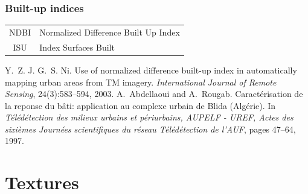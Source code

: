 \documentclass[compress]{beamer}
\begin{document}
\begin{frame}
\frametitle{Built-up indices}
\footnotesize \centering
\begin{tabular}{|c|l|}
\hline
NDBI &  Normalized Difference Built Up Index \cite{Zha2003-NDBI} \\
ISU &  Index Surfaces Built \cite{Abdellaoui1997-ISU} \\
\hline
\end{tabular}
\begin{thebibliography}{noidea}
\tiny
{}
Y.~Z. J. G.~S. Ni.
 Use of normalized difference built-up index in automatically mapping
  urban areas from {TM} imagery.
 {\em International Journal of Remote Sensing}, 24(3):583--594,
        2003.
A.~Abdellaoui and A.~Rougab.
 Caract\'erisation de la reponse du b\^ati: application au complexe
  urbain de {B}lida ({A}lg\'erie).
 In {\em T\'el\'ed\'etection des milieux urbains et p\'eriurbains,
  AUPELF - UREF, Actes des sixi\`emes Journ\'ees scientifiques du r\'eseau
  T\'el\'ed\'etection de l'AUF}, pages 47--64, 1997.
\end{thebibliography}
\end{frame}


\section{Textures}
\end{document}
